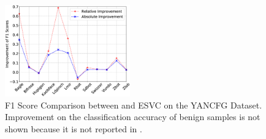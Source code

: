 \begin{figure}
\centerline{\includegraphics[width=0.48\textwidth]{Magic/figures/YanAcfgF1Improve.eps}}
\caption{F1 Score Comparison between \sysname and ESVC\cite{YanDataset} on the YANCFG Dataset.
Improvement on the classification accuracy of benign samples is not shown because it is not reported in \cite{YanDataset}.}
\label{fig:YANCFGF1Improve}
\end{figure}


